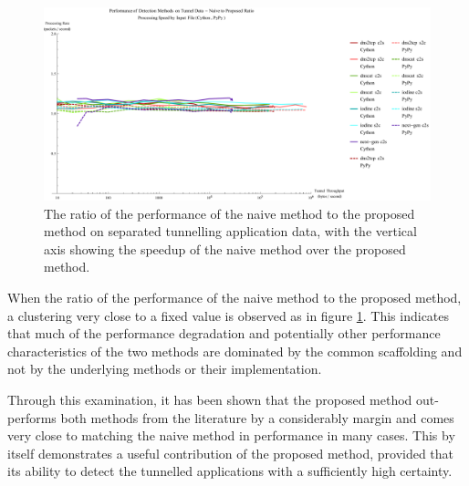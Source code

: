 \documentclass[12pt]{report}
\theoremstyle{remark}
\theoremstyle{definition}
\theoremstyle{definition}
\theoremstyle{definition}
\begin{document}
\begin{figure}
\centering
\includegraphics[width=\textwidth]{figures/ppia-naive2proposed.pdf}
\caption[Performance Ratio of the Naive Method to the Proposed Method on Tunnel
Data by Python Interpreter]{The ratio of the performance of the naive method to
the proposed method on separated tunnelling application data, with the vertical
axis showing the speedup of the naive method over the proposed method.}
\label{ppia-naive2proposed}
\end{figure}

When the ratio of the performance of the naive method to the proposed method, a
clustering very close to a fixed value is observed as in figure
\ref{ppia-naive2proposed}. This indicates that much of the performance
degradation and potentially other performance characteristics of the two methods
are dominated by the common scaffolding and not by the underlying methods or
their implementation.

Through this examination, it has been shown that the proposed method
out-performs both methods from the literature by a considerably margin and comes
very close to matching the naive method in performance in many cases. This by
itself demonstrates a useful contribution of the proposed method, provided that
its ability to detect the tunnelled applications with a sufficiently high
certainty.
\end{document}
